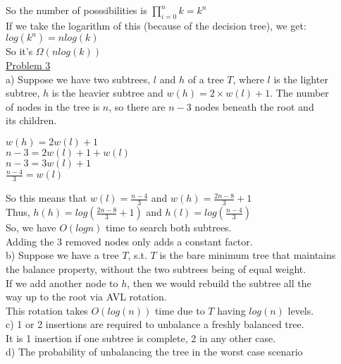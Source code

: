 \documentclass[12pt]{article}
\begin{document}
So the number of posssibilities is $\prod_{i = 0}^{n} k = k^n$\\
If we take the logarithm of this (because of the decision tree), we get:\\
\indent $log(k^n) = nlog(k)$\\
So it's $\Omega(nlog(k))$\\
\underline{Problem 3}\\
a) Suppose we have two subtrees, $l$ and $h$ of a tree $T$, where $l$ is the lighter\\
\indent subtree, $h$ is the heavier subtree and $w(h) = 2 \times w(l) + 1$. The number\\
\indent of nodes in the tree is $n$, so there are $n-3$ nodes beneath the root and\\
\indent its children.\\
\begin{center}
$w(h) = 2w(l) + 1$\\
$n - 3 = 2w(l) + 1 + w(l)$\\
$n - 3 = 3w(l) + 1$\\
$\frac{n - 4}{3} = w(l)$\\
\end{center}
\indent\indent So this means that $w(l) = \frac{n - 4}{3}$ and $w(h) = \frac{2n - 8}{3} + 1$\\
\indent Thus, $h(h) = log{(\frac{2n-8}{3} + 1)}$ and $h(l) = log{(\frac{n - 4}{3})}$\\
\indent So, we have $O(logn)$ time to search both subtrees.\\
\indent Adding the 3 removed nodes only adds a constant factor.\\
b) Suppose we have a tree $T$, s.t. $T$ is the bare minimum tree that maintains\\
\indent the balance property, without the two subtrees being of equal weight.\\
\indent If we add another node to $h$, then we would rebuild the subtree all the\\
\indent way up to the root via AVL rotation.\\
\indent This rotation takes $O(log(n))$ time due to $T$ having $log(n)$ levels.\\
c) 1 or 2 insertions are required to unbalance a freshly balanced tree.\\
\indent It is 1 insertion if one subtree is complete, 2 in any other case.\\
d) The probability of unbalancing the tree in the worst case scenario\\
\end{document}
